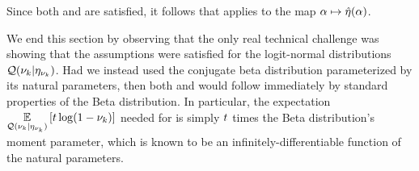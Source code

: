 Since both  and  are satisfied,
it follows that  applies to the map $\alpha \mapsto
\hat\eta(\alpha)$.

We end this section by observing that the only real technical challenge was
showing that the assumptions were satisfied for the logit-normal distributions
$\mathcal{Q}(\nu_{k} \vert \eta_{\nu_{k}})$.  Had we instead used the conjugate beta distribution
parameterized by its natural parameters, then both  and
 would follow immediately by standard properties of the
Beta distribution.  In particular, the expectation $\underset{\mathcal{Q}(\nu_{k} \vert
\eta_{\nu_{k}})}{\mathbb{E}}\left[t \log (1 - \nu_{k})\right]$ needed for  is simply $t$
times the Beta distribution's moment parameter, which is known to be an
infinitely-differentiable function of the natural parameters.
